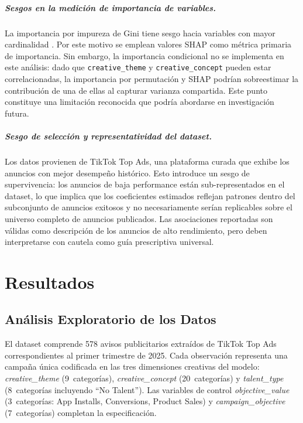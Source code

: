 \documentclass[12pt, a4paper]{report}
\begin{document}
\paragraph{Sesgos en la medición de importancia de variables.}
La importancia por impureza de Gini tiene sesgo hacia variables con mayor cardinalidad
\citep{strobl2007}. Por este motivo se emplean valores SHAP como métrica primaria de
importancia. Sin embargo, la importancia condicional \citep{strobl2008} no se implementa
en este análisis: dado que \texttt{creative\_theme} y \texttt{creative\_concept} pueden
estar correlacionadas, la importancia por permutación y SHAP podrían sobreestimar la
contribución de una de ellas al capturar varianza compartida. Este punto constituye una
limitación reconocida que podría abordarse en investigación futura.

\paragraph{Sesgo de selección y representatividad del dataset.}
Los datos provienen de TikTok Top Ads, una plataforma curada que exhibe los anuncios
con mejor desempeño histórico. Esto introduce un sesgo de supervivencia: los anuncios
de baja performance están sub-representados en el dataset, lo que implica que los
coeficientes estimados reflejan patrones dentro del subconjunto de anuncios exitosos
y no necesariamente serían replicables sobre el universo completo de anuncios publicados.
Las asociaciones reportadas son válidas como descripción de los anuncios de alto
rendimiento, pero deben interpretarse con cautela como guía prescriptiva universal.

\chapter{Resultados}

\section{Análisis Exploratorio de los Datos}

El dataset comprende 578 avisos publicitarios extraídos de TikTok Top Ads
correspondientes al primer trimestre de 2025. Cada observación representa
una campaña única codificada en las tres dimensiones creativas del modelo:
\textit{creative\_theme} (9~categorías), \textit{creative\_concept}
(20~categorías) y \textit{talent\_type} (8~categorías incluyendo ``No
Talent''). Las variables de control \textit{objective\_value}
(3~categorías: App Installs, Conversions, Product Sales) y
\textit{campaign\_objective} (7~categorías) completan la especificación.
\end{document}
